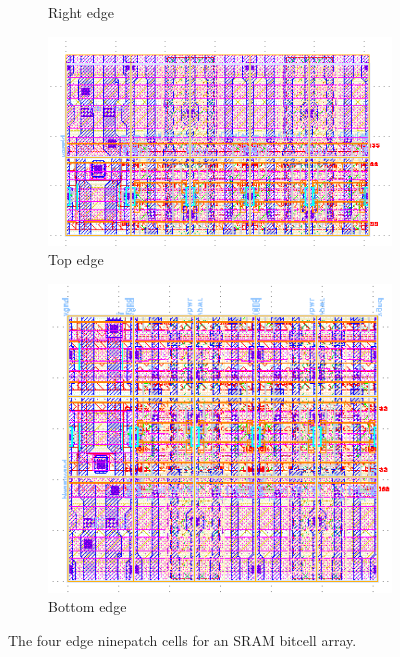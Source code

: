 \begin{figure}[H]
\begin{subfigure}[b]{0.22\textwidth}
\caption{Right edge}
\end{subfigure}
\hfill
\begin{subfigure}[b]{0.22\textwidth} \centering
\includegraphics[width=\textwidth]{figures/bitcell_top.png}
\caption{Top edge}
\end{subfigure}
\hfill
\begin{subfigure}[b]{0.22\textwidth} \centering
\includegraphics[width=\textwidth]{figures/bitcell_bot.png}
\caption{Bottom edge}
\end{subfigure}

\caption{The four edge ninepatch cells for an SRAM bitcell array. \label{fig:bitcell-ninepatch-edge-tiles}}
\end{figure}

